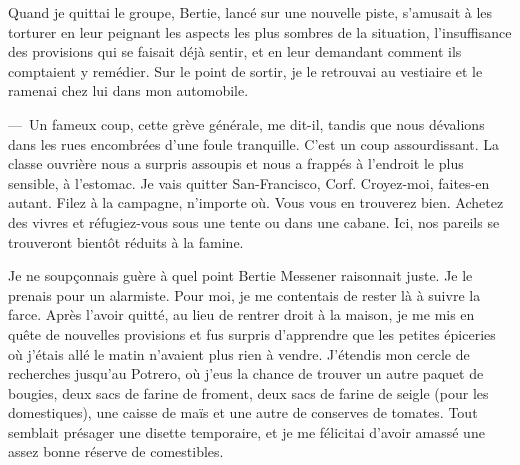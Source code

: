 \documentclass[french,twoside]{book} %
\newcommand{\astermono}{\medskip\centerline{\color{rubric}\large\selectfont{\syms ✻}}\medskip\par}%
\begin{document}
Quand je quittai le groupe, Bertie, lancé sur une nouvelle piste, s’amusait à les torturer en leur peignant les aspects les plus sombres de la situation, l’insuffisance des provisions qui se faisait déjà sentir, et en leur demandant comment ils comptaient y remédier. Sur le point de sortir, je le retrouvai au vestiaire et le ramenai chez lui dans mon automobile.\par
— Un fameux coup, cette grève générale, me dit-il, tandis que nous dévalions dans les rues encombrées d’une foule tranquille. C’est un coup assourdissant. La classe ouvrière nous a surpris assoupis et nous a frappés à l’endroit le plus sensible, à l’estomac. Je vais quitter San-Francisco, Corf. Croyez-moi, faites-en autant. Filez à la campagne, n’importe où. Vous vous en trouverez bien. Achetez des vivres et réfugiez-vous sous une tente ou dans une cabane. Ici, nos pareils se trouveront bientôt réduits à la famine.\par
Je ne soupçonnais guère à quel point Bertie Messener raisonnait juste. Je le prenais pour un alarmiste. Pour moi, je me contentais de rester là à suivre la farce. Après l’avoir quitté, au lieu de rentrer droit à la maison, je me mis en quête de nouvelles provisions et fus surpris d’apprendre que les petites épiceries où j’étais allé le matin n’avaient plus rien à vendre. J’étendis mon cercle de recherches jusqu’au Potrero, où j’eus la chance de trouver un autre paquet de bougies, deux sacs de farine de froment, deux sacs de farine de seigle (pour les domestiques), une caisse de maïs et une autre de conserves de tomates. Tout semblait présager une disette temporaire, et je me félicitai d’avoir amassé une assez bonne réserve de comestibles.\par

\astermono
\end{document}
